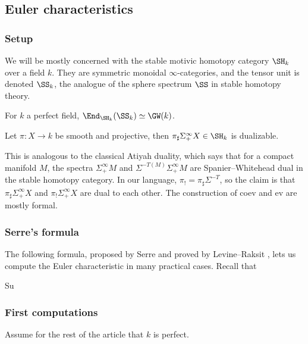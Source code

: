 \subsection{Euler characteristics}

\subsubsection{Setup}

We will be mostly concerned with the stable motivic homotopy category $\SH_k$ over a field $k$. They are symmetric monoidal $\infty$-categories, and the tensor unit is denoted $\SS_k$, the analogue of the sphere spectrum $\SS$ in stable homotopy theory. 


\begin{theorem}[Morel]
	For $k$ a perfect field, $\End_{\SH_k}(\SS_k)\simeq \GW(k)$.
\end{theorem}

\begin{theorem}[]
	Let $\pi:X\to k$ be smooth and projective, then $\pi_\sharp \Sigma^\infty_+X\in \SH_k$ is dualizable. 
\end{theorem}


This is analogous to the classical Atiyah duality, which says that for a compact manifold $M$, the spectra $\Sigma^\infty_+M$ and $\Sigma^{-T(M)}\Sigma^\infty_+M$ are Spanier--Whitehead dual in the stable homotopy category. In our language, $\pi_!=\pi_\sharp\Sigma^{-T}$, so the claim is that $\pi_\sharp \Sigma^\infty_+X$ and $\pi_! \Sigma^\infty_+X$ are dual to each other. The construction of coev and ev are mostly formal.

\subsubsection{Serre's formula}

The following formula, proposed by Serre and proved by Levine--Raksit \cite{}, lets us compute the Euler characteristic in many practical cases. Recall that 

\begin{theorem}
	Su
\end{theorem}



\subsubsection{First computations}

Assume for the rest of the article that $k$ is perfect.

